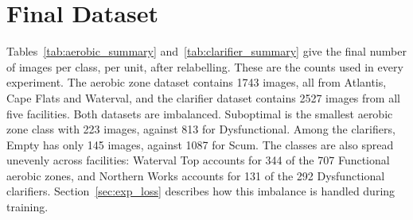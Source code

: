 \section{Final Dataset}\label{sec:final_dataset}

Tables~\ref{tab:aerobic_summary} and~\ref{tab:clarifier_summary} give the final number of images per class, per unit, after relabelling. These are the counts used in every experiment. The aerobic zone dataset contains 1743 images, all from Atlantis, Cape Flats and Waterval, and the clarifier dataset contains 2527 images from all five facilities. Both datasets are imbalanced. Suboptimal is the smallest aerobic zone class with 223 images, against 813 for Dysfunctional. Among the clarifiers, Empty has only 145 images, against 1087 for Scum. The classes are also spread unevenly across facilities: Waterval Top accounts for 344 of the 707 Functional aerobic zones, and Northern Works accounts for 131 of the 292 Dysfunctional clarifiers. Section~\ref{sec:exp_loss} describes how this imbalance is handled during training.

